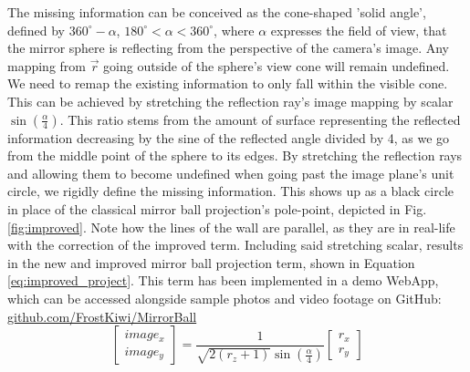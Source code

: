 \documentclass[10pt]{article}
\begin{document}
\begin{multicols}{2}
	The missing information can be conceived as the cone-shaped 'solid angle', defined by $360^{\circ} -\alpha$, $180^{\circ}<\alpha<360^{\circ}$, where $\alpha$ expresses the field of view, that the mirror sphere is reflecting from the perspective of the camera's image. Any mapping from $\vec{r}$ going outside of the sphere's view cone will remain undefined. We need to remap the existing information to only fall within the visible cone. This can be achieved by stretching the reflection ray's image mapping by scalar $\sin{\left(\frac{\alpha}{4}\right)}$. This ratio stems from the amount of surface representing the reflected information decreasing by the sine of the reflected angle divided by 4, as we go from the middle point of the sphere to its edges. By stretching the reflection rays and allowing them to become undefined when going past the image plane's unit circle, we rigidly define the missing information. This shows up as a black circle in place of the classical mirror ball projection's pole-point, depicted in Fig. \ref{fig:improved}. Note how the lines of the wall are parallel, as they are in real-life with the correction of the improved term. Including said stretching scalar, results in the new and improved mirror ball projection term, shown in Equation \ref{eq:improved_project}. This term has been implemented in a demo WebApp, which can be accessed alongside sample photos and video footage on GitHub: \href{https://github.com/FrostKiwi/MirrorBall}{github.com/FrostKiwi/MirrorBall}
	\begin{equation}\label{eq:improved_project}
		\begin{bmatrix} image_x \\ image_y \end{bmatrix}=\frac{1}{\sqrt{2(r_z+1)}\sin{\left(\frac{\alpha}{4}\right)}}\begin{bmatrix} r_x \\ r_y \end{bmatrix}
	\end{equation}


\end{multicols}
\end{document}

